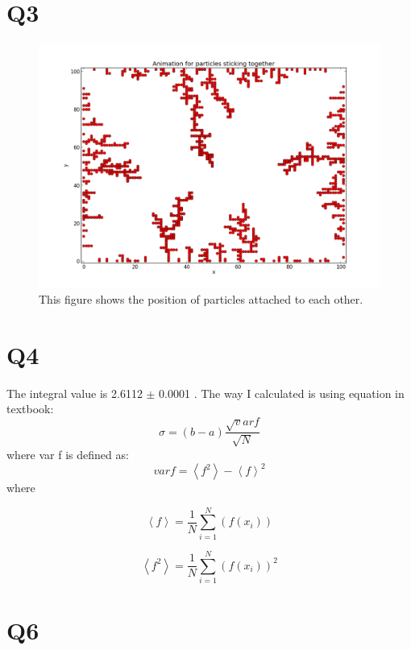 \documentclass[letterpaper,12pt]{article}
\begin{document}
\section*{Q3}

\FloatBarrier
\begin{figure}[H]
\centering
\includegraphics[scale=0.55]{q3.png}
\caption{This figure shows the position of particles attached to each other.}
\end{figure}
\FloatBarrier

\section*{Q4}
The integral value is 2.6112 $\pm$ 0.0001 . The way I calculated is using equation in textbook:
\begin{equation}
\sigma = (b-a) \frac{\sqrt var f}{\sqrt N}
\end{equation}
where var f is defined as:
\begin{equation}
var f =\left \langle f^2 \right \rangle - \left \langle f \right \rangle ^2
\end{equation}
where

\begin{equation}
\left \langle f \right \rangle = \frac{1}{N} \sum_{i=1}^{N}(f(x_i))
\end{equation}

\begin{equation}
\left \langle f^2 \right \rangle = \frac{1}{N} \sum_{i=1}^{N} (f(x_i))^2
\end{equation}



\section*{Q6}
\end{document}
